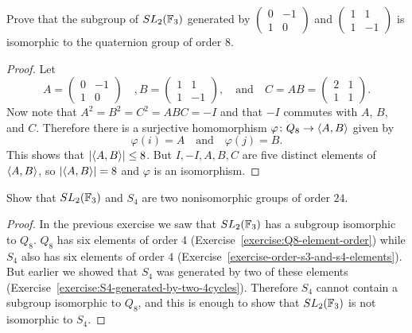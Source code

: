  Prove that the subgroup of $SL_2(\mathbb{F}_3)$ generated by
$\begin{pmatrix} 0 & -1 \\ 1 & 0 \end{pmatrix}$ and
$\begin{pmatrix} 1 & 1 \\ 1 & -1 \end{pmatrix}$ is isomorphic to the
quaternion group of order $8$.
\begin{proof}
  Let
  \begin{equation*}
    A = \begin{pmatrix} 0 & -1 \\ 1 & 0 \end{pmatrix}
    \quad,
    B = \begin{pmatrix} 1 & 1 \\ 1 & -1 \end{pmatrix},
    \quad\text{and}\quad
    C = AB = \begin{pmatrix} 2 & 1 \\ 1 & 1 \end{pmatrix}.
  \end{equation*}
  Now note that $A^2 = B^2 = C^2 = ABC = -I$ and that $-I$ commutes
  with $A$, $B$, and $C$. Therefore there is a surjective homomorphism
  $\varphi\colon Q_8\to\langle{A,B}\rangle$ given by
  \begin{equation*}
    \varphi(i) = A \quad\text{and}\quad \varphi(j) = B.
  \end{equation*}
  This shows that $\lvert{\langle{A,B}\rangle}\rvert\leq8$. But $I, -I, A, B, C$ are
  five distinct elements of $\langle{A,B}\rangle$, so $\lvert{\langle{A,B}\rangle}\rvert = 8$ and
  $\varphi$ is an isomorphism.
\end{proof}

 Show that $SL_2(\mathbb{F}_3)$ and $S_4$ are two nonisomorphic
groups of order $24$.
\begin{proof}
  In the previous exercise we saw that $SL_2(\mathbb{F}_3)$ has a subgroup
  isomorphic to $Q_8$. $Q_8$ has six elements of order $4$
  (Exercise~\ref{exercise:Q8-element-order}) while $S_4$ also has six
  elements of order $4$
  (Exercise~\ref{exercise-order-s3-and-s4-elements}). But earlier we
  showed that $S_4$ was generated by two of these elements
  (Exercise~\ref{exercise:S4-generated-by-two-4cycles}). Therefore
  $S_4$ cannot contain a subgroup isomorphic to $Q_8$, and this is
  enough to show that $SL_2(\mathbb{F}_3)$ is not isomorphic to $S_4$.
\end{proof}

